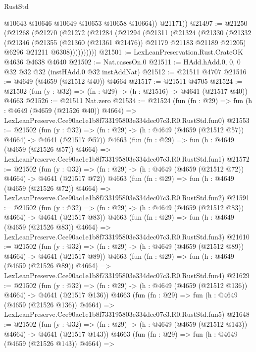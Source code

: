 \begin{lexlean}{RustStd}
\begin{coremodule}
            @10643
            @10646
            @10649
            @10653
            @10658
            @10664))
        @21171))
@21497 := @21250
    (@21268
      (@21270
        (@21272
          (@21284
            (@21294
              (@21311
                (@21324
                  (@21330
                    (@21332
                      (@21346
                        (@21355 (@21360 (@21361 @21476)) @21179 @21183 @21189 @21205)
                        @6296
                        @21211
                        @6308))))))))))
@21501 := LexLeanPreservation.Rust.CrateOK @4636 @4638 @4640
@21502 := Nat.casesOn.{0}
@21511 := HAdd.hAdd.{0, 0, 0} @32 @32 @32 (instHAdd.{0} @32 instAddNat)
@21512 := @21511 @4707
@21516 := @4649 (@4659 (@21512 @40)) @4664
@21517 := @21511 @4705
@21524 := @21502 (fun (y : @32) => (fn : @29) -> (h : @21516) -> @4641 (@21517 @40)) @4663
@21526 := @21511 Nat.zero
@21534 := @21524
    (fun (fn : @29) =>
    fun (h : @4649 (@4659 (@21526 @40)) @4664) =>
    LexLeanPreserve.Cce90ac1e1b8f733195803e334dec07c3.R0.RustStd.fun0)
@21553 := @21502
    (fun (y : @32) => (fn : @29) -> (h : @4649 (@4659 (@21512 @57)) @4664) -> @4641 (@21517 @57))
    @4663
    (fun (fn : @29) =>
    fun (h : @4649 (@4659 (@21526 @57)) @4664) =>
    LexLeanPreserve.Cce90ac1e1b8f733195803e334dec07c3.R0.RustStd.fun1)
@21572 := @21502
    (fun (y : @32) => (fn : @29) -> (h : @4649 (@4659 (@21512 @72)) @4664) -> @4641 (@21517 @72))
    @4663
    (fun (fn : @29) =>
    fun (h : @4649 (@4659 (@21526 @72)) @4664) =>
    LexLeanPreserve.Cce90ac1e1b8f733195803e334dec07c3.R0.RustStd.fun2)
@21591 := @21502
    (fun (y : @32) => (fn : @29) -> (h : @4649 (@4659 (@21512 @83)) @4664) -> @4641 (@21517 @83))
    @4663
    (fun (fn : @29) =>
    fun (h : @4649 (@4659 (@21526 @83)) @4664) =>
    LexLeanPreserve.Cce90ac1e1b8f733195803e334dec07c3.R0.RustStd.fun3)
@21610 := @21502
    (fun (y : @32) => (fn : @29) -> (h : @4649 (@4659 (@21512 @89)) @4664) -> @4641 (@21517 @89))
    @4663
    (fun (fn : @29) =>
    fun (h : @4649 (@4659 (@21526 @89)) @4664) =>
    LexLeanPreserve.Cce90ac1e1b8f733195803e334dec07c3.R0.RustStd.fun4)
@21629 := @21502
    (fun (y : @32) => (fn : @29) -> (h : @4649 (@4659 (@21512 @136)) @4664) -> @4641 (@21517 @136))
    @4663
    (fun (fn : @29) =>
    fun (h : @4649 (@4659 (@21526 @136)) @4664) =>
    LexLeanPreserve.Cce90ac1e1b8f733195803e334dec07c3.R0.RustStd.fun5)
@21648 := @21502
    (fun (y : @32) => (fn : @29) -> (h : @4649 (@4659 (@21512 @143)) @4664) -> @4641 (@21517 @143))
    @4663
    (fun (fn : @29) =>
    fun (h : @4649 (@4659 (@21526 @143)) @4664) =>

\end{coremodule}
\end{lexlean}
